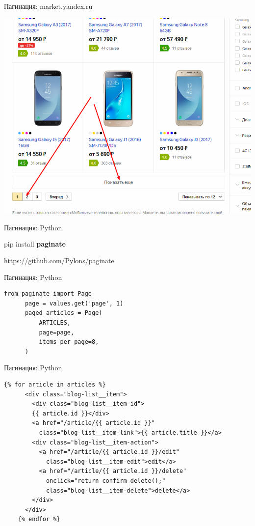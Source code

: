 \begin{frame}{Пагинация: market.yandex.ru}

  \begin{center}
    \includegraphics[width=\textwidth]{media/yandex-market-pagination.png}
  \end{center}

\end{frame}

\begin{frame}{Пагинация: Python}

  pip install \textbf{paginate}

  https://github.com/Pylons/paginate

\end{frame}

\begin{frame}[fragile]{Пагинация: Python}

  \begin{lstlisting}[style=python]
      from paginate import Page
      page = values.get('page', 1)
      paged_articles = Page(
          ARTICLES,
          page=page,
          items_per_page=8,
      )
  \end{lstlisting}

\end{frame}

\begin{frame}[fragile]{Пагинация: Python}

  \begin{lstlisting}[style=python]
    {% for article in articles %}
      <div class="blog-list__item">
        <div class="blog-list__item-id">
        {{ article.id }}</div>
        <a href="/article/{{ article.id }}"
          class="blog-list__item-link">{{ article.title }}</a>
        <div class="blog-list__item-action">
          <a href="/article/{{ article.id }}/edit"
            class="blog-list__item-edit">edit</a>
          <a href="/article/{{ article.id }}/delete"
            onclick="return confirm_delete();"
            class="blog-list__item-delete">delete</a>
        </div>
      </div>
    {% endfor %}
  \end{lstlisting}

\end{frame}

